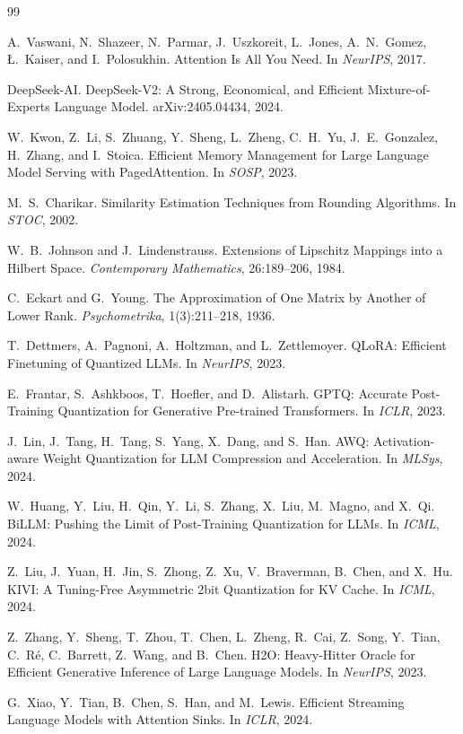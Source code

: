 \documentclass[11pt]{article}
\theoremstyle{plain}
\theoremstyle{definition}
\begin{document}
\begin{thebibliography}{99}
\setlength{\itemsep}{2pt}

 A.~Vaswani, N.~Shazeer, N.~Parmar, J.~Uszkoreit,
L.~Jones, A.~N.~Gomez, {\L}.~Kaiser, and I.~Polosukhin.
\newblock Attention Is All You Need.
\newblock In \emph{NeurIPS}, 2017.

 DeepSeek-AI.
\newblock DeepSeek-V2: A Strong, Economical, and Efficient
Mixture-of-Experts Language Model.
\newblock arXiv:2405.04434, 2024.

 W.~Kwon, Z.~Li, S.~Zhuang, Y.~Sheng, L.~Zheng,
C.~H.~Yu, J.~E.~Gonzalez, H.~Zhang, and I.~Stoica.
\newblock Efficient Memory Management for Large Language Model Serving
with PagedAttention.
\newblock In \emph{SOSP}, 2023.

 M.~S.~Charikar.
\newblock Similarity Estimation Techniques from Rounding Algorithms.
\newblock In \emph{STOC}, 2002.

 W.~B.~Johnson and J.~Lindenstrauss.
\newblock Extensions of Lipschitz Mappings into a Hilbert Space.
\newblock \emph{Contemporary Mathematics}, 26:189--206, 1984.

 C.~Eckart and G.~Young.
\newblock The Approximation of One Matrix by Another of Lower Rank.
\newblock \emph{Psychometrika}, 1(3):211--218, 1936.

 T.~Dettmers, A.~Pagnoni, A.~Holtzman, and L.~Zettlemoyer.
\newblock QLoRA: Efficient Finetuning of Quantized LLMs.
\newblock In \emph{NeurIPS}, 2023.

 E.~Frantar, S.~Ashkboos, T.~Hoefler, and D.~Alistarh.
\newblock GPTQ: Accurate Post-Training Quantization for Generative
Pre-trained Transformers.
\newblock In \emph{ICLR}, 2023.

 J.~Lin, J.~Tang, H.~Tang, S.~Yang, X.~Dang, and S.~Han.
\newblock AWQ: Activation-aware Weight Quantization for LLM Compression
and Acceleration.
\newblock In \emph{MLSys}, 2024.

 W.~Huang, Y.~Liu, H.~Qin, Y.~Li, S.~Zhang, X.~Liu,
M.~Magno, and X.~Qi.
\newblock BiLLM: Pushing the Limit of Post-Training Quantization for
LLMs.
\newblock In \emph{ICML}, 2024.

 Z.~Liu, J.~Yuan, H.~Jin, S.~Zhong, Z.~Xu, V.~Braverman,
B.~Chen, and X.~Hu.
\newblock KIVI: A Tuning-Free Asymmetric 2bit Quantization for KV Cache.
\newblock In \emph{ICML}, 2024.

 Z.~Zhang, Y.~Sheng, T.~Zhou, T.~Chen, L.~Zheng, R.~Cai,
Z.~Song, Y.~Tian, C.~R\'e, C.~Barrett, Z.~Wang, and B.~Chen.
\newblock H2O: Heavy-Hitter Oracle for Efficient Generative Inference of
Large Language Models.
\newblock In \emph{NeurIPS}, 2023.

 G.~Xiao, Y.~Tian, B.~Chen, S.~Han, and M.~Lewis.
\newblock Efficient Streaming Language Models with Attention Sinks.
\newblock In \emph{ICLR}, 2024.

\end{thebibliography}
\end{document}
